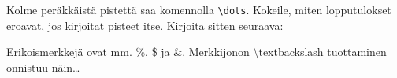     \begin{harj}
        Kolme peräkkäistä pistettä saa komennolla \verb-\dots-. Kokeile, miten lopputulokset eroavat, jos kirjoitat pisteet itse.  Kirjoita sitten seuraava:
        \begin{sample}
            Erikoismerkkejä ovat mm. \%, \$ ja \&. Merkkijonon \textbackslash textbackslash tuottaminen onnistuu näin\dots
        \end{sample}
    \end{harj}
